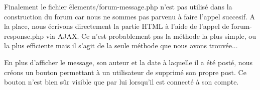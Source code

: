                 

                Finalement le fichier \f{elements/forum-message.php} n'est pas utilisé dans la construction du forum car nous ne sommes pas parvenu à faire l'appel succesif. A la place, nous écrivons directement la partie HTML à l'aide de l'appel de \f{forum-response.php} via AJAX. Ce n'est probablement pas la méthode la plus simple, ou la plus efficiente mais il s'agit de la seule méthode que nous avons trouvée...

                \medskip
                En plus d'afficher le message, son auteur et la date à laquelle il a été posté, nous créons un bouton permettant à un utilisateur de supprimé son propre post. Ce bouton n'est bien sûr visible que par lui lorsqu'il est connecté à son compte.